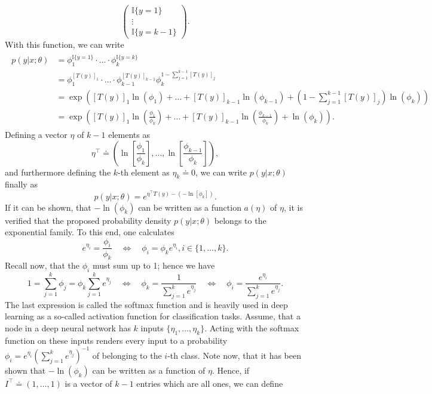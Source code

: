 \documentclass[a4paper,11pt]{article}
\numberwithin{equation}{section}
\begin{document}
{\begin{equation}
\begin{pmatrix}
	\mathbb{I}\{y=1\} \\ \vdots \\ \mathbb{I}\{y=k-1\}
\end{pmatrix}.
\end{equation} With this function, we can write \begin{align}
\begin{aligned}
	p(y|x;\theta) &= \phi_1^{\mathbb{I}\{y=1\}}\cdot \dots \cdot \phi_k^{\mathbb{I}\{y=k\}} \\
	&= \phi_1^{[T(y)]_1}\cdot \dots \cdot \phi_{k-1}^{[T(y)]_{k-1}}\phi_k^{1-\sum_{j=1}^{k-1}[T(y)]_j} \\ 
	&= \exp\left([T(y)]_1\ln(\phi_1)+\dots+[T(y)]_{k-1}\ln(\phi_{k-1})+\left(1-\sum_{j=1}^{k-1}[T(y)]_j\right)\ln(\phi_k)\right) \\
	&= \exp\left([T(y)]_1\ln\left(\frac{\phi_1}{\phi_k}\right)+\dots + [T(y)]_{k-1}\ln\left(\frac{\phi_{k-1}}{\phi_k}\right)+\ln(\phi_k)\right).
\end{aligned}
\end{align} Defining a vector $\eta$ of $k-1$ elements as \begin{equation}
\eta^\top \doteq \left(\ln\left[\frac{\phi_1}{\phi_k}\right],\dots,\ln\left[\frac{\phi_{k-1}}{\phi_k}\right]\right),
\end{equation} and furthermore defining the $k$-th element as $\eta_k \doteq 0$, we can write $p(y|x;\theta)$ finally as \begin{equation}
p(y|x;\theta) = e^{\eta^\top T(y) - (-\ln[\phi_k])}.
\end{equation} If it can be shown, that $-\ln(\phi_k)$ can be written as a function $a(\eta)$ of $\eta$, it is verified that the proposed probability density $p(y|x;\theta)$ belongs to the exponential family. To this end, one calculates \begin{equation}
e^{\eta_i} = \frac{\phi_i}{\phi_k} \quad \Leftrightarrow \quad \phi_i = \phi_k e^{\eta_i}, i \in \{1,\dots,k\}.
\end{equation} Recall now, that the $\phi_i$ must sum up to 1; hence we have \begin{equation}
1=\sum_{j=1}^{k}\phi_j = \phi_k\sum_{j=1}^k e^{\eta_j} \quad \Leftrightarrow \quad  \phi_k = \frac{1}{\sum_{j=1}^k e^{\eta_j}} \quad \Leftrightarrow \quad \phi_i = \frac{e^{\eta_i}}{\sum_{j=1}^{k}e^{\eta_j}}.
\end{equation} The last expression is called the softmax function and is heavily used in deep learning as a so-called activation function for classification tasks. Assume, that a node in a deep neural network has $k$ inputs $\{\eta_1,\dots,\eta_k\}$. Acting with the softmax function on these inputs renders every input to a probability $\phi_i = e^{\eta_i}\left(\sum_{j=1}^{k}e^{\eta_j}\right)^{-1}$ of belonging to the $i$-th class. Note now, that it has been shown that $-\ln(\phi_k)$ can be written as a function of $\eta$. Hence, if $I^\top \doteq (1,\dots,1)$ is a vector of $k-1$ entries which are all ones, we can define 
}
\end{document}
